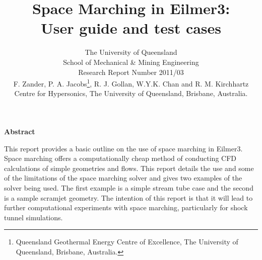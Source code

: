 \documentclass[12pt,a4paper]{article}
\title{
    Space Marching in Eilmer3: \\
    User guide and test cases
}
\author{
    The University of Queensland \\
    School of Mechanical \& Mining Engineering \\
    Research Report Number 2011/03 
    \vspace{0.5cm} \\
    F. Zander, 
    P. A. Jacobs\thanks{Queensland Geothermal Energy Centre of 
     Excellence, The University of Queensland, Brisbane, Australia.},
    R. J. Gollan, 
    W.Y.K. Chan and 
    R. M. Kirchhartz\\
    {Centre for Hypersonics, The University of 
     Queensland, Brisbane, Australia.}
\\
}
\begin{document}
\maketitle

\centerline{\textbf{Abstract}}
\medskip
This report provides a basic outline on the use of space marching in Eilmer3. Space marching offers a computationally cheap method of conducting CFD calculations of simple geometries and flows. This report details the use and some of the limitations of the space marching solver and gives two examples of the solver being used. The first example is a simple stream tube case and the second is a sample scramjet geometry. The intention of this report is that it will lead to further computational experiments with space marching, particularly for shock tunnel simulations.
\newpage
\tableofcontents







\newpage



\newpage
\appendix


\end{document}
